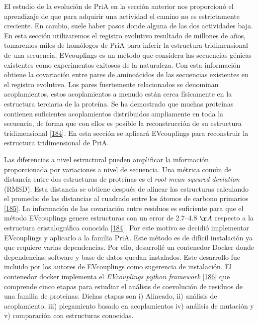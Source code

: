 \documentclass[12pt,twoside]{reedthesis}
\begin{document}
  El estudio de la evolución de PriA en la sección anterior nos
  proporcionó el aprendizaje de que para adquirir una actividad el camino
  no es estrictamente creciente. En cambio, suele haber pasos donde alguna
  de las dos actividades baja. En esta sección utilizaremos el registro
  evolutivo resultado de millones de años, tomaremos miles de homólogos de
  PriA para inferir la estructura tridimensional de una secuencia.
  EVcouplings es un método que considera las secuencias génicas existentes
  como experimentos exitosos de la naturaleza. Con esta información
  obtiene la covariación entre pares de aminoácidos de las secuencias
  existentes en el registro evolutivo. Los pares fuertemente relacionados
  se denominan acoplamientos, estos acoplamientos a menudo están cerca
  físicamente en la estructura terciaria de la proteína. Se ha demostrado
  que muchas proteínas contienen suficientes acoplamientos distribuidos
  ampliamente en toda la secuencia, de forma que con ellos es posible la
  reconstrucción de su estructura tridimensional
  {[}\protect\hyperlink{ref-marks_protein_2011}{184}{]}. En esta sección
  se aplicará EVcouplings para reconstruir la estructura tridimensional de
  PriA.
  
  Las diferencias a nivel estructural pueden amplificar la información
  proporcionada por variaciones a nivel de secuencia. Una métrica común de
  distancia entre dos estructuras de proteínas es el \emph{root mean
  sqaured deviation} (RMSD). Esta distancia se obtiene después de alinear
  las estructuras calculando el promedio de las distancias al cuadrado
  entre los átomos de carbono primarios
  {[}\protect\hyperlink{ref-kufareva_methods_2012}{185}{]}. La información
  de las covariación entre residuos es suficiente para que el método
  EVcouplings genere estructuras con un error de 2.7--4.8 \({\AA}\)
  respecto a la estructura cristalográfica conocida
  {[}\protect\hyperlink{ref-marks_protein_2011}{184}{]}. Por este motivo
  se decidió implementar EVcouplings y aplicarlo a la familia PriA. Este
  método es de difícil instalación ya que requiere varias dependencias.
  Por ello, desarrollé un contenedor Docker donde dependencias, software y
  base de datos quedan instalados. Este desarrollo fue incluido por los
  autores de EVcouplings como sugerencia de instalación. El contenedor
  docker implementa el \emph{EVcouplings python framework}
  {[}\protect\hyperlink{ref-hopf_evcouplings_2019}{186}{]} que comprende
  cinco etapas para estudiar el análisis de coevolución de residuos de una
  familia de proteínas. Dichas etapas son i) Alineado, ii) análisis de
  acoplamiento, iii) plegamiento basado en acoplamientos iv) análisis de
  mutación y v) comparación con estructuras conocidas.
  
\end{document}
